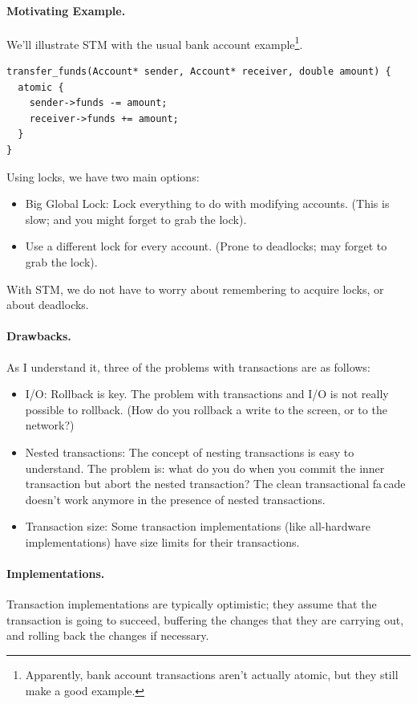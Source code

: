 \documentclass[a4paper]{report}
\begin{document}
\paragraph{Motivating Example.} We'll illustrate STM with the usual bank account example\footnote{Apparently, bank account transactions aren't actually atomic, but they still make a good example.}.
  \begin{lstlisting}
transfer_funds(Account* sender, Account* receiver, double amount) {
  atomic {
    sender->funds -= amount;
    receiver->funds += amount;
  }
}
  \end{lstlisting}

Using locks, we have two main options:
      \begin{itemize}
        \item Big Global Lock: Lock everything to do with modifying accounts. (This is slow; and you might forget to grab the lock).
        \item Use a different lock for every account. (Prone to deadlocks; may forget to grab the lock).
      \end{itemize}
With STM, we do not have to worry about remembering to acquire locks,
or about deadlocks.

\paragraph{Drawbacks.} As I understand it, three of the problems with 
transactions are as follows:

\begin{itemize}
\item I/O: Rollback is key. The problem with transactions and I/O is
  not really possible to rollback. (How do you rollback a write to the
  screen, or to the network?)

\item Nested transactions: The concept of nesting transactions is easy
  to understand. The problem is: what do you do when you commit the
  inner transaction but abort the nested transaction? The clean
  transactional fa\,cade doesn't work anymore in the presence of
  nested transactions.

\item Transaction size: Some transaction implementations (like
  all-hardware implementations) have size limits for their
  transactions.
\end{itemize}

\paragraph{Implementations.} Transaction implementations are typically 
optimistic; they assume that the transaction is going to succeed,
buffering the changes that they are carrying out, and rolling back the
changes if necessary.
\end{document}
